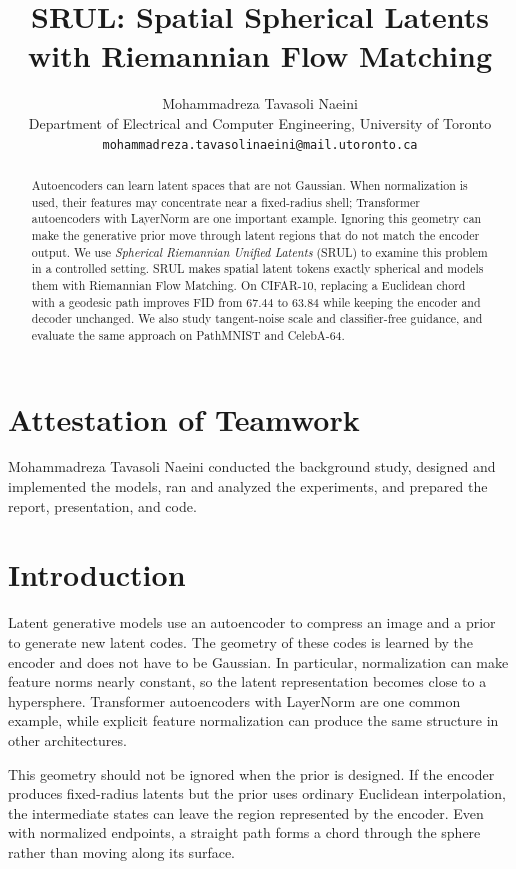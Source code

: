\documentclass{article}
\title{SRUL: Spatial Spherical Latents with Riemannian Flow Matching}
\author{Mohammadreza Tavasoli Naeini \\
Department of Electrical and Computer Engineering, University of Toronto \\
\texttt{mohammadreza.tavasolinaeini@mail.utoronto.ca}}
\begin{document}
\maketitle

\begin{abstract}
Autoencoders can learn latent spaces that are not Gaussian. When normalization is used, their features may concentrate near a fixed-radius shell; Transformer autoencoders with LayerNorm are one important example. Ignoring this geometry can make the generative prior move through latent regions that do not match the encoder output. We use \emph{Spherical Riemannian Unified Latents} (SRUL) to examine this problem in a controlled setting. SRUL makes spatial latent tokens exactly spherical and models them with Riemannian Flow Matching. On CIFAR-10, replacing a Euclidean chord with a geodesic path improves FID from $67.44$ to $63.84$ while keeping the encoder and decoder unchanged. We also study tangent-noise scale and classifier-free guidance, and evaluate the same approach on PathMNIST and CelebA-64.
\end{abstract}

\section*{Attestation of Teamwork}
Mohammadreza Tavasoli Naeini conducted the background study, designed and implemented the models, ran and analyzed the experiments, and prepared the report, presentation, and code.

\section{Introduction}
Latent generative models use an autoencoder to compress an image and a prior to generate new latent codes. The geometry of these codes is learned by the encoder and does not have to be Gaussian. In particular, normalization can make feature norms nearly constant, so the latent representation becomes close to a hypersphere. Transformer autoencoders with LayerNorm are one common example, while explicit feature normalization can produce the same structure in other architectures.

This geometry should not be ignored when the prior is designed. If the encoder produces fixed-radius latents but the prior uses ordinary Euclidean interpolation, the intermediate states can leave the region represented by the encoder. Even with normalized endpoints, a straight path forms a chord through the sphere rather than moving along its surface.
\end{document}

